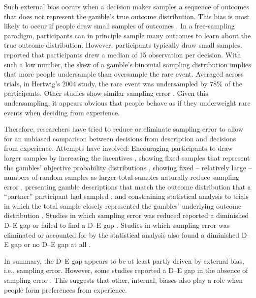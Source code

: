 Such external bias occurs when a decision maker samples a sequence of outcomes that does not represent the gamble's true outcome distribution. This bias is most likely to occur if people draw small samples of outcomes  \citep[e.g.,][]{Hadar2009}. In a free-sampling paradigm, participants can in principle sample many outcomes to learn about the true outcome distribution. However, participants typically draw small samples. \cite{Hertwig2004} reported that participants drew a median of 15 observation per decision. With such a low number, the skew of a gamble's binomial sampling distribution implies that more people undersample than oversample the rare event. Averaged across trials, in Hertwig's 2004 study, the rare event was undersampled by $78\%$ of the participants. Other studies show similar sampling error \citep[e.g.,][]{Hau2008,Rakow2008}. Given this undersampling, it appears obvious that people behave as if they underweight rare events when deciding from experience.

Therefore, researchers have tried to reduce or eliminate sampling error to allow for an unbiased comparison between decisions from description and decisions from experience. Attempts have involved: Encouraging participants to draw larger samples by increasing the incentives \citep{Hau2008}, showing fixed samples that represent the gambles' objective probability distributions \citep{Ungemach2009}, showing fixed -- relatively large -- numbers of random samples as larger total samples naturally reduce sampling error \citep{Hau2008,Hau2010}, presenting gamble descriptions that match the outcome distribution that a ``partner'' participant had sampled \citep{Rakow2008}, and constraining statistical analysis to trials in which the total sample closely represented the gambles' underlying outcome-distribution \citep[e.g.,][]{Camilleri2009, Camilleri2011a}. Studies in which sampling error was reduced reported a diminished D--E gap \citep{Hau2008,Hau2010} or failed to find a D--E gap \citep{Gloeckner2012}. Studies in which sampling error was eliminated or accounted for by the statistical analysis also found a diminished D--E gap \citep{Ungemach2009} or no D--E gap at all \citep{Camilleri2009,Camilleri2011a,Rakow2008}. 

In summary, the D--E gap appears to be at least partly driven by external bias, i.e., sampling error. However, some studies reported a D--E gap in the absence of sampling error \citep{Hau2008, Hau2010, Ungemach2009}. This suggests that other, internal, biases also play a role when people form preferences from experience. 

